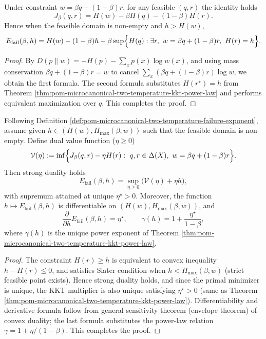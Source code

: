 \begin{proposition}\label{prop:pom-microcanonical-two-temperature-js-identity}
Under constraint \(w=\beta q+(1-\beta)r\), for any feasible \((q,r)\) the identity holds
\[
J_\beta(q,r)=H(w)-\beta H(q)-(1-\beta)H(r).
\]
Hence when the feasible domain is non-empty and \(h>H(w)\),
\[
E_{\mathrm{fail}}(\beta,h)
=H(w)-(1-\beta)h-\beta\sup\Bigl\{H(q):\exists r,\ w=\beta q+(1-\beta)r,\ H(r)=h\Bigr\}.
\]
\end{proposition}
\begin{proof}
By \(D(p\|w)=-H(p)-\sum_x p(x)\log w(x)\), and using mass conservation
\(
\beta q+(1-\beta)r=w
\)
to cancel \(\sum_x(\beta q+(1-\beta)r)\log w\), we obtain the first formula.
The second formula substitutes \(H(r^\star)=h\) from Theorem \ref{thm:pom-microcanonical-two-temperature-kkt-power-law} and performs equivalent maximization over \(q\). This completes the proof.
\end{proof}
\begin{theorem}\label{thm:pom-microcanonical-two-temperature-strong-duality-sensitivity}
Following Definition \ref{def:pom-microcanonical-two-temperature-failure-exponent}, assume given \(h\in(H(w),H_{\max}(\beta,w))\) such that the feasible domain is non-empty.
Define dual value function (\(\eta\ge 0\))
\[
\mathcal{V}(\eta):=\inf\Bigl\{J_\beta(q,r)-\eta H(r):\ q,r\in\Delta(X),\ w=\beta q+(1-\beta)r\Bigr\}.
\]
Then strong duality holds
\[
E_{\mathrm{fail}}(\beta,h)=\sup_{\eta\ge 0}\bigl(\mathcal{V}(\eta)+\eta h\bigr),
\]
with supremum attained at unique \(\eta^\star>0\).
Moreover, the function \(h\mapsto E_{\mathrm{fail}}(\beta,h)\) is differentiable on \((H(w),H_{\max}(\beta,w))\), and
\[
\frac{\partial}{\partial h}E_{\mathrm{fail}}(\beta,h)=\eta^\star,
\qquad
\gamma(h)=1+\frac{\eta^\star}{1-\beta},
\]
where \(\gamma(h)\) is the unique power exponent of Theorem \ref{thm:pom-microcanonical-two-temperature-kkt-power-law}.
\end{theorem}
\begin{proof}
The constraint \(H(r)\ge h\) is equivalent to convex inequality \(h-H(r)\le 0\), and satisfies Slater condition when \(h< H_{\max}(\beta,w)\) (strict feasible point exists).
Hence strong duality holds, and since the primal minimizer is unique, the KKT multiplier is also unique satisfying \(\eta^\star>0\) (same as Theorem \ref{thm:pom-microcanonical-two-temperature-kkt-power-law}).
Differentiability and derivative formula follow from general sensitivity theorem (envelope theorem) of convex duality;
the last formula substitutes the power-law relation \(\gamma=1+\eta/(1-\beta)\). This completes the proof.
\end{proof}
